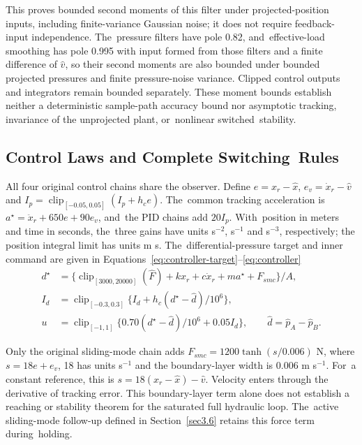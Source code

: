 \documentclass[machines,article,submit,pdftex,moreauthors]{Definitions/mdpi}
\begin{document}
This proves bounded second moments of this filter under projected-position inputs, including finite-variance Gaussian noise; it does not require feedback-input independence. The~pressure filters have pole 0.82, and~effective-load smoothing has pole 0.995 with input formed from those filters and a finite difference of $\hat v$, so their second moments are also bounded under bounded projected pressures and finite pressure-noise variance. Clipped control outputs and integrators remain bounded separately. These moment bounds establish neither a deterministic sample-path accuracy bound nor asymptotic tracking, invariance of the unprojected plant, or~nonlinear switched~stability.



\subsection{Control Laws and Complete Switching~Rules}
\label{sec3.3}

All four original control chains share the observer. Define $e=x_r-\hat x$, $e_v=\dot x_r-\hat v$ and $I_p=\operatorname{clip}_{[-0.05,0.05]}(I_p+h_ce)$. The~common tracking acceleration is $a^\star=\ddot x_r+650e+90e_v$, and~the PID chains add $20I_p$. With~position in meters and time in seconds, the~three gains have units s$^{-2}$, s$^{-1}$ and s$^{-3}$, respectively; the position integral limit has units m s. The~differential-pressure target and inner command are given in Equations~\eqref{eq:controller-target}--\eqref{eq:controller}
\begin{align}
d^\star&=\{\operatorname{clip}_{[3000,20000]}(\hat F)+kx_r+c\dot x_r+ma^\star+F_{smc}\}/A,\label{eq:controller-target}\\
I_d&=\operatorname{clip}_{[-0.3,0.3]}\{I_d+h_c(d^\star-\hat d)/10^6\},\label{eq:controller-integral}\\
u&=\operatorname{clip}_{[-1,1]}\{0.70(d^\star-\hat d)/10^6+0.05I_d\},\qquad \hat d=\hat p_A-\hat p_B.
\label{eq:controller}
\end{align}

Only the original sliding-mode chain adds $F_{smc}=1200\tanh(s/0.006)$ N, where $s=18e+e_v$, 18 has units s$^{-1}$ and the boundary-layer width is 0.006 m s$^{-1}$. For~a constant reference, this is $s=18(x_r-\hat x)-\hat v$. Velocity enters through the derivative of tracking error. This boundary-layer term alone does not establish a reaching or stability theorem for the saturated full hydraulic loop. The~active sliding-mode follow-up defined in Section~\ref{sec3.6} retains this force term during~holding.
\end{document}
